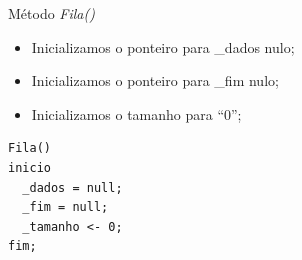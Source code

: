 \documentclass[12pt,table,xcolor={dvipsnames}]{beamer}
\begin{document}
\begin{frame}[fragile]{Método \textit{Fila()}}

\begin{itemize}
\item Inicializamos o ponteiro para \_dados nulo;
\item Inicializamos o ponteiro para \_fim nulo;
\item Inicializamos o tamanho para ``0'';
\end{itemize}
\begin{lstlisting}
Fila()
inicio
  _dados = null;
  _fim = null;
  _tamanho <- 0;
fim;
\end{lstlisting}
\end{frame}
\end{document}
